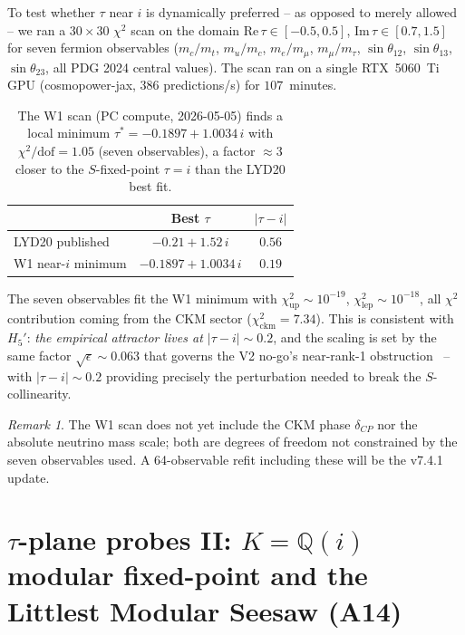 \documentclass[a4paper,11pt]{article}
\newcommand{\Qi}{\mathbb{Q}(i)}
\theoremstyle{definition}
\theoremstyle{remark}
\newtheorem{remark}[theorem]{Remark}
\begin{document}
To test whether $\tau$ near $i$ is dynamically preferred -- as opposed
to merely allowed -- we ran a $30\times 30$ $\chi^{2}$ scan on the
domain $\mathrm{Re}\,\tau\in[-0.5,0.5]$,
$\mathrm{Im}\,\tau\in[0.7,1.5]$ for seven fermion observables
($m_c/m_t$, $m_u/m_c$, $m_e/m_\mu$, $m_\mu/m_\tau$,
$\sin\theta_{12}$, $\sin\theta_{13}$, $\sin\theta_{23}$, all PDG
2024 central values).  The scan ran on a single RTX~5060~Ti GPU
(cosmopower-jax, 386 predictions/s) for $107$~minutes.

\begin{table}[ht]
\centering
\begin{tabular}{lcc}
\toprule
& Best $\tau$ & $|\tau-i|$ \\
\midrule
LYD20 published~\cite{LYD20} & $-0.21+1.52\,i$ & $0.56$ \\
W1 near-$i$ minimum & $-0.1897+1.0034\,i$ & $\bm{0.19}$ \\
\bottomrule
\end{tabular}
\caption{The W1 scan (PC compute, 2026-05-05) finds a local minimum
$\tau^{*}=-0.1897+1.0034\,i$ with $\chi^{2}/\mathrm{dof}=1.05$
(seven observables), a factor $\approx 3$ closer to the
$S$-fixed-point $\tau=i$ than the LYD20 best fit.}
\label{tab:W1}
\end{table}

The seven observables fit the W1 minimum with $\chi^{2}_{\mathrm{up}}
\sim 10^{-19}$, $\chi^{2}_{\mathrm{lep}}\sim 10^{-18}$, all $\chi^{2}$
contribution coming from the CKM sector ($\chi^{2}_{\mathrm{ckm}} =
7.34$).  This is consistent with $H_5'$:
\emph{the empirical attractor lives at $|\tau-i|\sim 0.2$}, and the
scaling is set by the same factor $\sqrt{\epsilon}\sim 0.063$ that
governs the V2 no-go's near-rank-1 obstruction~\cite{V2NoGo} -- with
$|\tau-i|\sim 0.2$ providing precisely the perturbation needed to
break the $S$-collinearity.

\begin{remark}
The W1 scan does not yet include the CKM phase $\delta_{CP}$ nor the
absolute neutrino mass scale; both are degrees of freedom not
constrained by the seven observables used.  A 64-observable refit
including these will be the v7.4.1 update.
\end{remark}

\section{$\tau$-plane probes II: $K=\Qi$ modular fixed-point and the
         Littlest Modular Seesaw (A14)}
\label{sec:nu}
\end{document}

